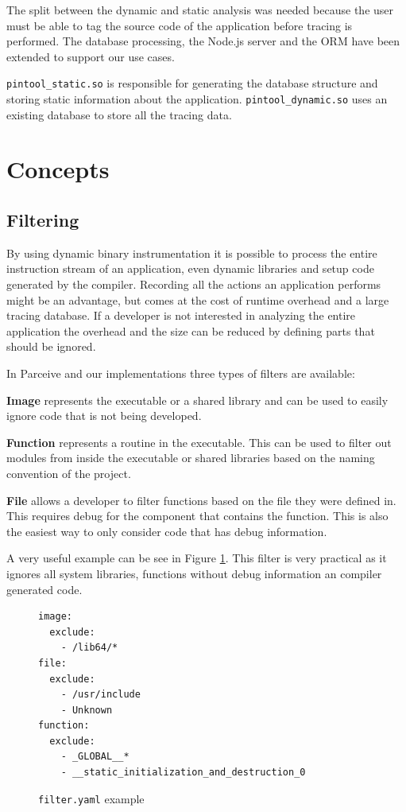 The split between the dynamic and static analysis was needed because the user must be able to tag the source code of the application before tracing is performed. The database processing, the Node.js server and the ORM have been extended to support our use cases.

\texttt{pintool\_static.so} is responsible for generating the database structure and storing static information about the application. \texttt{pintool\_dynamic.so} uses an existing database to store all the tracing data.

\section{Concepts}

\subsection{Filtering}

By using dynamic binary instrumentation it is possible to process the entire instruction stream of an application, even dynamic libraries and setup code generated by the compiler. Recording all the actions an application performs might be an advantage, but comes at the cost of runtime overhead and a large tracing database. If a developer is not interested in analyzing the entire application the overhead and the size can be reduced by defining parts that should be ignored.

In Parceive and our implementations three types of filters are available:

\textbf{Image} represents the executable or a shared library and can be used to easily ignore code that is not being developed.

\textbf{Function} represents a routine in the executable. This can be used to filter out modules from inside the executable or shared libraries based on the naming convention of the project.

\textbf{File} allows a developer to filter functions based on the file they were defined in. This requires debug for the component that contains the function. This is also the easiest way to only consider code that has debug information.

A very useful example can be see in Figure \ref{cap3:filter-example}. This filter is very practical as it ignores all system libraries, functions without debug information an compiler generated code.

\begin{figure}
	\begin{center}
		\begin{verbatim}
image:
  exclude:
    - /lib64/*
file:
  exclude:
    - /usr/include
    - Unknown
function:
  exclude:
    - _GLOBAL__*
    - __static_initialization_and_destruction_0
		\end{verbatim}
	\end{center}
	\caption{\texttt{filter.yaml} example}
	\label{cap3:filter-example}
\end{figure}

